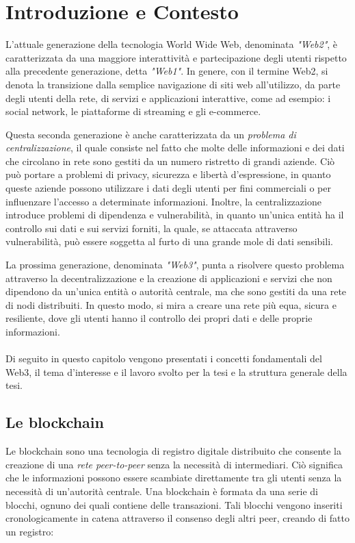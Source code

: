 \chapter{Introduzione e Contesto}
L'attuale generazione della tecnologia World Wide Web, denominata \textit{"Web2"}, è caratterizzata da una maggiore interattività e partecipazione degli utenti rispetto alla precedente generazione, detta \textit{"Web1"}. In genere, con il termine Web2, si denota la transizione dalla semplice navigazione di siti web all'utilizzo, da parte degli utenti della rete, di servizi e applicazioni interattive, come ad esempio: i social network, le piattaforme di streaming e gli e-commerce.

Questa seconda generazione è anche caratterizzata da un \textit{problema di centralizzazione}, il quale consiste nel fatto che molte delle informazioni e dei dati che circolano in rete sono gestiti da un numero ristretto di grandi aziende. Ciò può portare a problemi di privacy, sicurezza e libertà d'espressione, in quanto queste aziende possono utilizzare i dati degli utenti per fini commerciali o per influenzare l'accesso a determinate informazioni. Inoltre, la centralizzazione introduce problemi di dipendenza e vulnerabilità, in quanto un'unica entità ha il controllo sui dati e sui servizi forniti, la quale, se attaccata attraverso vulnerabilità, può essere soggetta al furto di una grande mole di dati sensibili.

La prossima generazione, denominata \textit{"Web3"}, punta a risolvere questo problema attraverso la decentralizzazione e la creazione di applicazioni e servizi che non dipendono da un'unica entità o autorità centrale, ma che sono gestiti da una rete di nodi distribuiti. In questo modo, si mira a creare una rete più equa, sicura e resiliente, dove gli utenti hanno il controllo dei propri dati e delle proprie informazioni.\\
\\
Di seguito in questo capitolo vengono presentati i concetti fondamentali del Web3, il tema d'interesse e il lavoro svolto per la tesi e la struttura generale della tesi.

\section{Le blockchain}
Le blockchain sono una tecnologia di registro digitale distribuito che consente la creazione di una \textit{rete peer-to-peer} senza la necessità di intermediari. Ciò significa che le informazioni possono essere scambiate direttamente tra gli utenti senza la necessità di un'autorità centrale.
Una blockchain è formata da una serie di blocchi, ognuno dei quali contiene delle transazioni. Tali blocchi vengono inseriti cronologicamente in catena attraverso il consenso degli altri peer, creando di fatto un registro:

